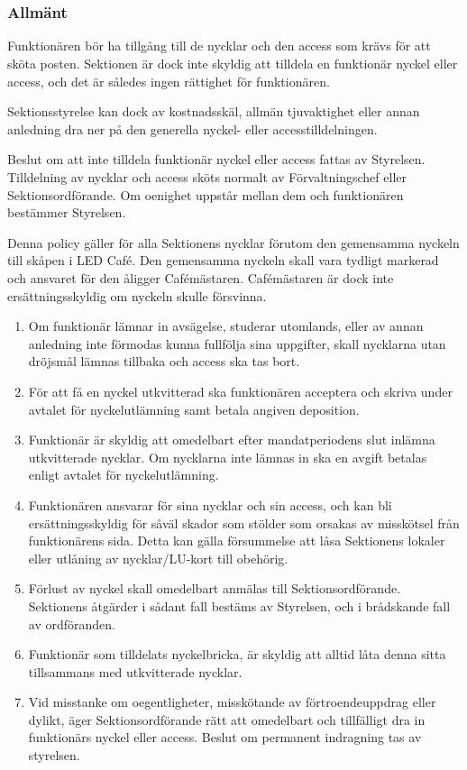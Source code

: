 \documentclass[10pt]{article}
\begin{document}
\section*{\doctitle}

\subsubsection*{Allmänt}

Funktionären bör ha tillgång till de nycklar och den access som krävs för att sköta posten. Sektionen är dock inte skyldig att tilldela en funktionär nyckel eller access, och det är således ingen rättighet för funktionären.

Sektionsstyrelse kan dock av kostnadsskäl, allmän tjuvaktighet eller annan anledning dra ner på den generella nyckel- eller accesstilldelningen.

Beslut om att inte tilldela funktionär nyckel eller access fattas av Styrelsen. Tilldelning av nycklar och access sköts normalt av Förvaltningschef eller Sektionsordförande. Om oenighet uppstår mellan dem och funktionären bestämmer Styrelsen.

Denna policy gäller för alla Sektionens nycklar förutom den gemensamma nyckeln till skåpen i LED Café. Den gemensamma nyckeln skall vara tydligt markerad och ansvaret för den åligger Cafémästaren. Cafémästaren är dock inte ersättningsskyldig om nyckeln skulle försvinna.

\begin{enumerate}[label=\S\arabic*.]
	\item Om funktionär lämnar in avsägelse, studerar utomlands, eller av annan anledning inte förmodas kunna fullfölja sina uppgifter, skall nycklarna utan dröjsmål lämnas tillbaka och access ska tas bort.
	\item För att få en nyckel utkvitterad ska funktionären acceptera och skriva under avtalet för nyckelutlämning samt betala angiven deposition.
	\item Funktionär är skyldig att omedelbart efter mandatperiodens slut inlämna utkvitterade nycklar. Om nycklarna inte lämnas in ska en avgift betalas enligt avtalet för nyckelutlämning.
	\item Funktionären ansvarar för sina nycklar och sin access, och kan bli ersättningsskyldig för såväl skador som stölder som orsakas av misskötsel från funktionärens sida. Detta kan gälla försummelse att låsa Sektionens lokaler eller utlåning av nycklar/LU-kort till obehörig.
	\item Förlust av nyckel skall omedelbart anmälas till Sektionsordförande. Sektionens åtgärder i sådant fall bestäms av Styrelsen, och i brådskande fall av ordföranden.
	\item Funktionär som tilldelats nyckelbricka, är skyldig att alltid låta denna sitta tillsammans med utkvitterade nycklar.
	\item Vid misstanke om oegentligheter, misskötande av förtroendeuppdrag eller dylikt, äger Sektionsordförande rätt att omedelbart och tillfälligt dra in funktionärs nyckel eller access. Beslut om permanent indragning tas av styrelsen.
\end{enumerate}
\end{document}
